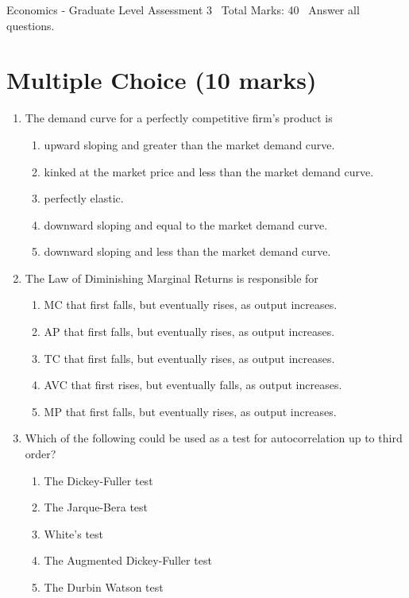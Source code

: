 \documentclass[12pt]{article}
\begin{document}
\begin{center}
Economics - Graduate Level Assessment 3 \
Total Marks: 40 \
Answer all questions.
\end{center}

\section*{Multiple Choice (10 marks)}
\begin{enumerate}[label=\arabic*.]
\item The demand curve for a perfectly competitive firm's product is
\begin{enumerate}[label=(\alph*)]
    \item upward sloping and greater than the market demand curve.
    \item kinked at the market price and less than the market demand curve.
    \item perfectly elastic.
    \item downward sloping and equal to the market demand curve.
    \item downward sloping and less than the market demand curve.
\end{enumerate}
\item The Law of Diminishing Marginal Returns is responsible for
\begin{enumerate}[label=(\alph*)]
    \item MC that first falls, but eventually rises, as output increases.
    \item AP that first falls, but eventually rises, as output increases.
    \item TC that first falls, but eventually rises, as output increases.
    \item AVC that first rises, but eventually falls, as output increases.
    \item MP that first falls, but eventually rises, as output increases.
\end{enumerate}
\item Which of the following could be used as a test for autocorrelation up to third order?
\begin{enumerate}[label=(\alph*)]
    \item The Dickey-Fuller test
    \item The Jarque-Bera test
    \item White's test
    \item The Augmented Dickey-Fuller test
    \item The Durbin Watson test

\end{enumerate}
\end{enumerate}
\end{document}

